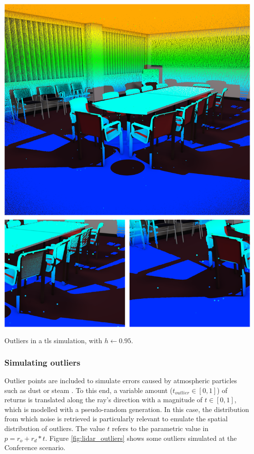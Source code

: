 \begin{marginfigure}[.3cm]
	\centering
	\includegraphics[width=\linewidth]{figs/lidar_simulation/outliers.png}
	\caption{Outliers in a \acrshort{tls} simulation, with $h \gets 0.95$.}
	\label{fig:lidar_outliers}
\end{marginfigure}

\subsubsection{Simulating outliers}

Outlier points are included to simulate errors caused by atmospheric particles such as dust or steam \cite{boehler_investigating_2018}. To this end, a variable amount ($t_{\textit{outlier}} \in [0, 1]$) of returns is translated along the ray's direction with a magnitude of $t \in [0, 1]$, which is modelled with a pseudo-random generation. In this case, the distribution from which noise is retrieved is particularly relevant to emulate the spatial distribution of outliers. The value $t$ refers to the parametric value in $p = r_o + r_d * t$. Figure \ref{fig:lidar_outliers} shows some outliers simulated at the Conference scenario.

